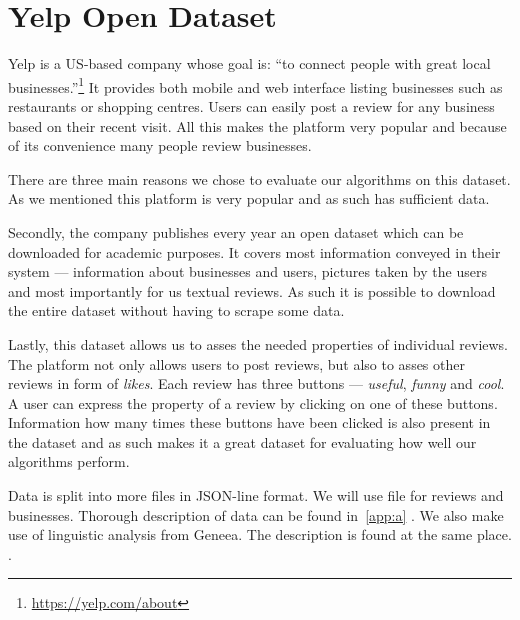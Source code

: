 \chapter{Yelp Open Dataset}

Yelp is a US-based company whose goal is: ``to connect people with great local businesses.''\footnote{\url{https://yelp.com/about}}
It provides both mobile and web interface listing businesses such as restaurants or shopping centres.
Users can easily post a review for any business based on their recent visit.
All this makes the platform very popular and because of its convenience many people review businesses.

There are three main reasons we chose to evaluate our algorithms on this dataset.
As we mentioned this platform is very popular and as such has sufficient data.

Secondly, the company publishes every year an open dataset which can be downloaded for academic
purposes.
It covers most information conveyed in their system ---  information about businesses and users, pictures taken by the users and most importantly for us textual reviews.
As such it is possible to download the entire dataset without having to scrape some data.

Lastly, this dataset allows us to asses the needed properties of individual reviews.
The platform not only allows users to post reviews, but also to asses other reviews in form of \emph{likes}.
Each review has three buttons --- \emph{useful}, \emph{funny} and \emph{cool}.
A user can express the property of a review by clicking on one of these buttons. Information how many times these buttons have been clicked is also present in the dataset and as such makes it a great dataset for evaluating how well our algorithms perform.

Data is split into more files in JSON-line format. We will use file for reviews and businesses.
Thorough description of data can be found in~\ref{app:a} .
We also make use of linguistic analysis from Geneea. The description is found at the same place.
.

